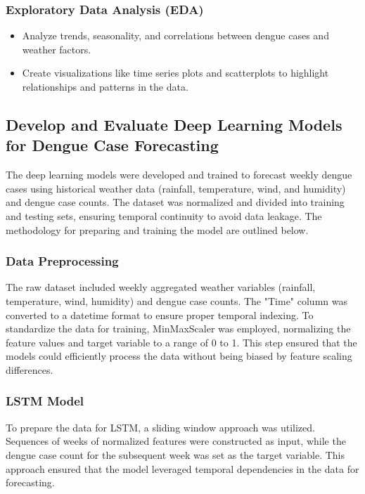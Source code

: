 \subsubsection{Exploratory Data Analysis (EDA)}
\begin{itemize}
	\item Analyze trends, seasonality, and correlations between dengue cases and weather factors.
	\item Create visualizations like time series plots and scatterplots to highlight relationships and patterns in the data.
\end{itemize}

\subsection{Develop and Evaluate Deep Learning Models for Dengue Case Forecasting}
The deep learning models were developed and trained to forecast weekly dengue cases using historical weather data (rainfall, temperature, wind, and humidity) and dengue case counts. The dataset was normalized and divided into training and testing sets, ensuring temporal continuity to avoid data leakage. The methodology for preparing and training the model are outlined below.
\subsubsection{Data Preprocessing}
The raw dataset included weekly aggregated weather variables (rainfall, temperature, wind, humidity) and dengue case counts. The "Time" column was converted to a datetime format to ensure proper temporal indexing. To standardize the data for training, MinMaxScaler was employed, normalizing the feature values and target variable to a range of 0 to 1. This step ensured that the models could efficiently process the data without being biased by feature scaling differences.

\subsubsection{LSTM Model}
To prepare the data for LSTM, a sliding window approach was utilized. Sequences of weeks of normalized features were constructed as input, while the dengue case count for the subsequent week was set as the target variable. This approach ensured that the model leveraged temporal dependencies in the data for forecasting.

